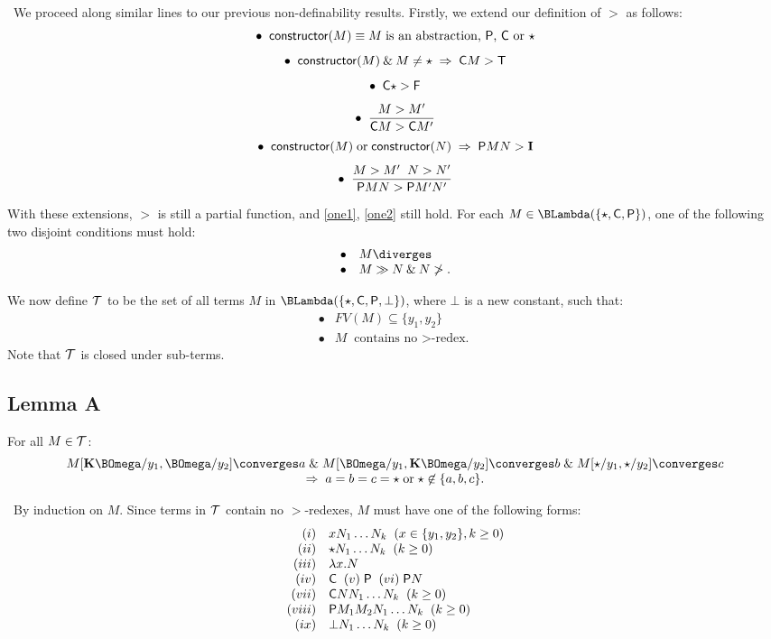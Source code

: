 \proof\ We proceed along similar lines to our previous non-definability results. Firstly, we extend our definition of $>$ as follows:
\[ \bullet \;\; {\sf constructor}(M) \equiv M \; \mbox{is an abstraction, {\sf P}, {\sf C} or $\star$} \]
\[ \bullet \;\; {\sf constructor}(M) \: \& \: M \not= \star \; \Rightarrow \; {\sf C} M > {\sf T} \]
\[ \bullet \;\; {\sf C} \star > {\sf F} \]
\[ \bullet \;\; \frac{M > M'}{{\sf C} M > {\sf C} M'} \]
\[ \bullet \;\; {\sf constructor}(M) \; \mbox{or} \; {\sf constructor}(N) \; \Rightarrow \; {\sf P} M N > {\bf I} \]
\[ \bullet \;\; \frac{M > M' \;\; N > N'}{{\sf P} M N > {\sf P} M' N'} \]

With these extensions, $>$ is still a partial function, and \ref{one1}, \ref{one2} still hold. For each $M \in \BLambda ( \{ \star , {\sf C} , {\sf P} \} )$, one of the following two disjoint conditions must hold:
\[ \begin{array}{cl}
\bullet & M \diverges \\
\bullet & M \gg N \: \& \: N \not> .
\end{array} \]

We now define $\cal T$ to be the set of all terms $M$ in $\BLambda ( \{ \star , {\sf C} , {\sf P} , \bot \} )$, where $\bot$ is a new constant, such that:
\[ \begin{array}{cl}
\bullet & FV(M) \subseteq \{ y_{1}, y_{2} \} \\
\bullet & M \; \mbox{contains no {$>$}-redex.}
\end{array} \]
Note that $\cal T$ is closed under sub-terms.

\subsection*{Lemma A}
For all $M \in {\cal T}$:
\[ \begin{array}{c}
M[ {\bf K} \BOmega / y_{1} , \BOmega / y_{2} ] \converges a \; \& \; 
M[ \BOmega / y_{1} , {\bf K} \BOmega / y_{2} ] \converges b \; \& \; 
M[ \star / y_{1} , \star / y_{2} ] \converges c \\
\Rightarrow \; a = b = c = \star \; \mbox{or} \;\star \not\in \{ a, b, c \} .
\end{array} \] 

\proof\ By induction on $M$. Since terms in $\cal T$ contain no $>$-redexes, $M$ must have one of the following forms:
\[ \begin{array}{rl}
(i) & x N_{1} \ldots N_{k} \;\; ( x \in \{ y_{1}, y_{2} \} , k \geq 0 ) \\
(ii) & \star N_{1} \ldots N_{k} \;\; (k \geq 0 ) \\
(iii) & \lambda x . N \\
(iv) & {\sf C} \;\; (v) \; {\sf P} \;\; (vi) \; {\sf P} N \\
(vii) & {\sf C} N N_{1} \ldots N_{k} \;\; (k \geq 0 ) \\
(viii) & {\sf P} M_{1} M_{2} N_{1} \ldots N_{k} \;\; (k \geq 0 ) \\
(ix) & \bot N_{1} \ldots N_{k} \;\; (k \geq 0 )
\end{array} \]

